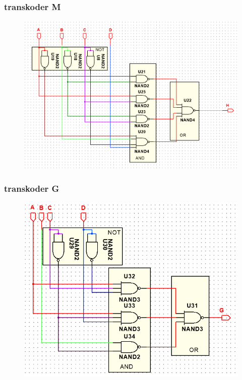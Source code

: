 \documentclass[a4paper]{article}
\begin{document}
\subsubsection{transkoder M}
\begin{figure}[H]
 \centering
 \includegraphics{schemat_H.png}
\end{figure}

\subsubsection{transkoder G}
\begin{figure}[H]
 \centering
 \includegraphics{schemat_G.png}
\end{figure}
\end{document}

